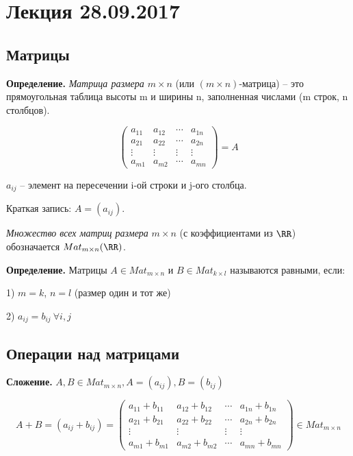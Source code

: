 \section{Лекция 28.09.2017}

\subsection{Матрицы}

\bigskip
\textbf{Определение.} \textit{Матрица размера $m \times n$} (или $(m \times n)$-матрица) -- это прямоугольная таблица высоты m и ширины n, заполненная числами (m строк, n столбцов).

\begin{equation*}
	\begin{pmatrix}
		a_{11} & a_{12} & \cdots & a_{1n} \\
		a_{21} & a_{22} & \cdots & a_{2n} \\
       \vdots & \vdots & \vdots& \vdots \\ 
       a_{m1} & a_{m2} & \cdots & a_{mn}
	\end{pmatrix}
    = A
\end{equation*}

\bigskip
$a_{ij}$ -- элемент на пересечении i-ой строки и j-ого столбца.

Краткая запись: $A = (a_{ij})$.

\bigskip
\textit{Множество всех матриц размера} $m \times n$ (с коэффициентами из $\RR$) обозначается $Mat_{m\times n}(\RR)$. 

\bigskip
\textbf{Определение.} Матрицы $A \in Mat_{m\times n}$ и $B \in Mat_{k\times l}$ называются равными, если:

1) $m = k$, $n = l$ (размер один и тот же)

2) $a_{ij} = b_{ij} \ \forall i, j$

\bigskip
\subsection{Операции над матрицами}

\bigskip
\textbf{Сложение.} $A, B \in Mat_{m\times n}, A = (a_{ij}), B = (b_{ij})$

\begin{equation*}A + B = (a_{ij} + b_{ij}) = 
\begin{pmatrix}
		a_{11} + b_{11} & a_{12} + b_{12} & \cdots & a_{1n} + b_{1n} \\
		a_{21} + b_{21} & a_{22} + b_{22} & \cdots & a_{2n} + b_{2n} \\
       \vdots & \vdots & \vdots& \vdots \\ 
       a_{m1} + b_{m1} & a_{m2} + b_{m2} & \cdots & a_{mn} + b_{mn}
\end{pmatrix} \in Mat_{m\times n}
\end{equation*}

